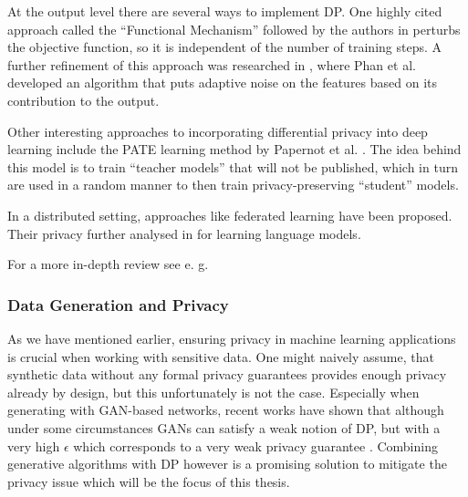 At the output level there are several ways to implement DP. One highly cited approach called the ``Functional Mechanism'' followed by the authors in \parencite{zhang2012functional} perturbs the objective function, so it is independent of the number of training steps. A further refinement of this approach was researched in \parencite{adlm2017}, where Phan et al. developed an algorithm that puts adaptive noise on the features based on its contribution to the output.

Other interesting approaches to incorporating differential privacy into deep learning include the PATE learning method by Papernot et al. \parencite{papernot2017semisupervised}. The idea behind this model is to train ``teacher models'' that will not be published, which in turn are used in a random manner to then train privacy-preserving ``student'' models. 

In a distributed setting, approaches like federated learning \parencite{konečný2015federated,Mo2019EfficientAP} have been proposed. Their privacy further analysed in \parencite{mcmahan2018learning} for learning language models.

\vspace*{1em}
For a more in-depth review see e. g. \parencite{surrve_ppml,surv_ppml_2,wang2023differential}


\subsubsection*{Data Generation and Privacy}

As we have mentioned earlier, ensuring privacy in machine learning applications is crucial when working with sensitive data. One might naively assume, that synthetic data without any formal privacy guarantees provides enough privacy already by design, but this unfortunately is not the case. Especially when generating with GAN-based networks, recent works have shown that although under some circumstances GANs can satisfy a weak notion of DP, but with a very high $\epsilon$ which corresponds to a very weak privacy guarantee \parencite{lin2021privacy,stadler2022synthetic,jordon2022synthetic}. Combining generative algorithms with DP however is a promising solution to mitigate the privacy issue \parencite{bellovin2019privacy} which will be the focus of this thesis.

